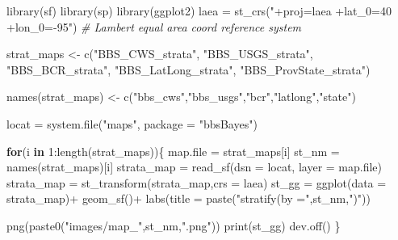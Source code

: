 \documentclass[
]{book}
\newenvironment{Shaded}{\begin{snugshade}}{\end{snugshade}}
\newcommand{\AttributeTok}[1]{\textcolor[rgb]{0.77,0.63,0.00}{#1}}
\newcommand{\CommentTok}[1]{\textcolor[rgb]{0.56,0.35,0.01}{\textit{#1}}}
\newcommand{\ControlFlowTok}[1]{\textcolor[rgb]{0.13,0.29,0.53}{\textbf{#1}}}
\newcommand{\DecValTok}[1]{\textcolor[rgb]{0.00,0.00,0.81}{#1}}
\newcommand{\FunctionTok}[1]{\textcolor[rgb]{0.00,0.00,0.00}{#1}}
\newcommand{\NormalTok}[1]{#1}
\newcommand{\OtherTok}[1]{\textcolor[rgb]{0.56,0.35,0.01}{#1}}
\newcommand{\SpecialCharTok}[1]{\textcolor[rgb]{0.00,0.00,0.00}{#1}}
\newcommand{\StringTok}[1]{\textcolor[rgb]{0.31,0.60,0.02}{#1}}
\begin{document}
\begin{Shaded}
\begin{Highlighting}[]
\FunctionTok{library}\NormalTok{(sf)}
\FunctionTok{library}\NormalTok{(sp)}
\FunctionTok{library}\NormalTok{(ggplot2)}
\NormalTok{laea }\OtherTok{=} \FunctionTok{st\_crs}\NormalTok{(}\StringTok{"+proj=laea +lat\_0=40 +lon\_0={-}95"}\NormalTok{) }\CommentTok{\# Lambert equal area coord reference system}

\NormalTok{strat\_maps }\OtherTok{\textless{}{-}} \FunctionTok{c}\NormalTok{(}\StringTok{"BBS\_CWS\_strata"}\NormalTok{,}
\StringTok{"BBS\_USGS\_strata"}\NormalTok{,}
\StringTok{"BBS\_BCR\_strata"}\NormalTok{,}
\StringTok{"BBS\_LatLong\_strata"}\NormalTok{,}
\StringTok{"BBS\_ProvState\_strata"}\NormalTok{)}

\FunctionTok{names}\NormalTok{(strat\_maps) }\OtherTok{\textless{}{-}} \FunctionTok{c}\NormalTok{(}\StringTok{"bbs\_cws"}\NormalTok{,}\StringTok{"bbs\_usgs"}\NormalTok{,}\StringTok{"bcr"}\NormalTok{,}\StringTok{"latlong"}\NormalTok{,}\StringTok{"state"}\NormalTok{)}

\NormalTok{locat }\OtherTok{=} \FunctionTok{system.file}\NormalTok{(}\StringTok{"maps"}\NormalTok{,}
                    \AttributeTok{package =} \StringTok{"bbsBayes"}\NormalTok{)}

\ControlFlowTok{for}\NormalTok{(i }\ControlFlowTok{in} \DecValTok{1}\SpecialCharTok{:}\FunctionTok{length}\NormalTok{(strat\_maps))\{}
\NormalTok{  map.file }\OtherTok{=}\NormalTok{ strat\_maps[i]}
\NormalTok{  st\_nm }\OtherTok{=} \FunctionTok{names}\NormalTok{(strat\_maps)[i]}
\NormalTok{strata\_map }\OtherTok{=} \FunctionTok{read\_sf}\NormalTok{(}\AttributeTok{dsn =}\NormalTok{ locat,}
                     \AttributeTok{layer =}\NormalTok{ map.file)}
\NormalTok{strata\_map }\OtherTok{=} \FunctionTok{st\_transform}\NormalTok{(strata\_map,}\AttributeTok{crs =}\NormalTok{ laea)}
\NormalTok{st\_gg }\OtherTok{=} \FunctionTok{ggplot}\NormalTok{(}\AttributeTok{data =}\NormalTok{ strata\_map)}\SpecialCharTok{+}
\FunctionTok{geom\_sf}\NormalTok{()}\SpecialCharTok{+}
\FunctionTok{labs}\NormalTok{(}\AttributeTok{title =} \FunctionTok{paste}\NormalTok{(}\StringTok{"stratify(by ="}\NormalTok{,st\_nm,}\StringTok{")"}\NormalTok{))}



\FunctionTok{png}\NormalTok{(}\FunctionTok{paste0}\NormalTok{(}\StringTok{"images/map\_"}\NormalTok{,st\_nm,}\StringTok{".png"}\NormalTok{))}
\FunctionTok{print}\NormalTok{(st\_gg)}
\FunctionTok{dev.off}\NormalTok{()}
\NormalTok{\}}
\end{Highlighting}
\end{Shaded}
\end{document}
